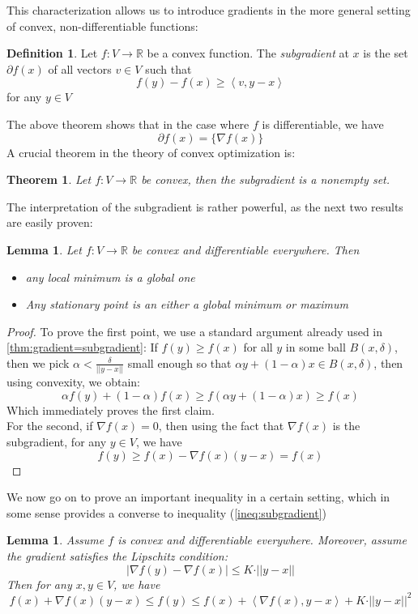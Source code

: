 \documentclass{book}
\theoremstyle{plain}
\newtheorem{theorem}[corollary]{Theorem}
\newtheorem{lemma}[corollary]{Lemma}
\theoremstyle{definition}
\newtheorem{definition}[corollary]{Definition}
\newcommand{\bl}[2]{\left\langle #1,#2\right\rangle}
\renewcommand{\d}[1]{\mathbb{#1}}
\newcommand{\mor}{\longrightarrow}
\begin{document}
\noindent This characterization allows us to introduce gradients in the more general setting of convex, non-differentiable functions:
\begin{definition}
Let $f:V\mor \d{R}$ be a convex function. The \emph{subgradient} at $x$ is the set $\partial f(x)$ of all vectors $v \in V$ such that 
\[
f(y)-f(x)\ge \bl{v}{ y-x}
\]	
for any $y \in V$
\end{definition}

\noindent The above theorem shows that in the case where $f$ is differentiable, we have
\[
\partial f(x)=\{\nabla f(x)\}
\]
A crucial theorem in the theory of convex optimization is:
\begin{theorem}
Let $f:V \mor \d{R}$ be convex, then the subgradient is a nonempty set.	
\end{theorem}

\noindent The interpretation of the subgradient is rather powerful, as the next two results are easily proven:
\begin{lemma}\label{lem:stationary_point=global_minimum}
Let $f:V\mor \d{R}$ be convex and differentiable everywhere. Then
\begin{itemize}
\item any local minimum is a global one
\item Any stationary point is an either a global minimum or maximum	
\end{itemize}
\end{lemma}

\begin{proof}
To prove the first point, we use a standard argument already used in \ref{thm:gradient=subgradient}:
If $f(y)\ge f(x)$ for all $y$ in some ball $B(x,\delta)$, then we pick $\alpha<\frac{\delta}{\vert \vert y-x \vert\vert }$ small enough so that $\alpha y+(1-\alpha)x \in B(x,\delta)$, then using convexity, we obtain:
\[
\alpha f(y)+(1-\alpha)f(x)\ge f(\alpha y+(1-\alpha)x)\ge f(x)
\]
Which immediately proves the first claim.\\
\noindent For the second, if $\nabla f(x)=0$, then using the fact that $\nabla f(x)$ is the subgradient, for any $y \in V$, we have
\[
f(y)\ge f(x)-\nabla f(x)(y-x)=f(x)
\]
\end{proof}

We now  go on to prove an important inequality in a certain setting, which in some sense provides a converse to inequality (\ref{ineq:subgradient})

\begin{lemma}
Assume $f$ is convex and differentiable everywhere. Moreover, assume the gradient satisfies the Lipschitz condition:
\[
\vert  \nabla f(y)-\nabla f(x) \vert \le K\cdot \vert \vert y-x\vert \vert 
\]	
Then for any $x,y \in V$, we have
\[
f(x)+\nabla f(x)(y-x) \le f(y)\le f(x)+\bl{\nabla f(x)}{y-x} + K \cdot \vert \vert y-x\vert \vert ^2
\]
\end{lemma}
\end{document}
